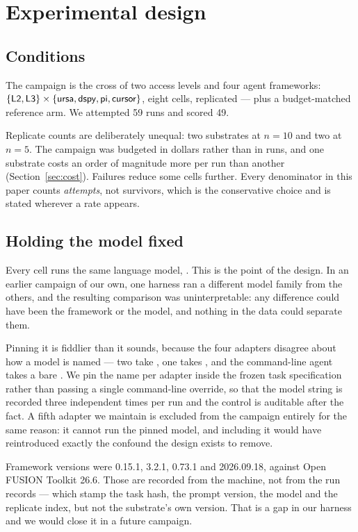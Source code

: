 \section{Experimental design}
\label{sec:design}

\subsection{Conditions}

The campaign is the cross of two access levels and four agent frameworks:
$\{\textsf{L2}{}, \textsf{L3}{}\} \times \{\textsf{ursa}, \textsf{dspy}, \textsf{pi}, \textsf{cursor}\}$,
eight cells, replicated --- plus a budget-matched \Lzero{} reference arm. We
attempted 59 runs and scored 49.

Replicate counts are deliberately unequal: two substrates at $n=10$ and two at
$n=5$. The campaign was budgeted in dollars rather than in runs, and one
substrate costs an order of magnitude more per run than another
(Section~\ref{sec:cost}). Failures reduce some cells further. Every denominator
in this paper counts \emph{attempts}, not survivors, which is the conservative
choice and is stated wherever a rate appears.

\subsection{Holding the model fixed}

Every cell runs the same language model, . This is the point of
the design. In an earlier campaign of our own, one harness ran a different
model family from the others, and the resulting comparison was uninterpretable:
any difference could have been the framework or the model, and nothing in the
data could separate them.

Pinning it is fiddlier than it sounds, because the four adapters disagree about
how a model is named --- two take , one takes
, and the command-line agent takes a bare .
We pin the name per adapter inside the frozen task specification rather than
passing a single command-line override, so that the model string is recorded
three independent times per run and the control is auditable after the fact. A
fifth adapter we maintain is excluded from the campaign entirely for the same
reason: it cannot run the pinned model, and including it would have reintroduced
exactly the confound the design exists to remove.

Framework versions were  0.15.1,  3.2.1,  0.73.1 and
 2026.09.18, against Open FUSION Toolkit 26.6. Those are recorded
from the machine, not from the run records --- which stamp the task hash, the
prompt version, the model and the replicate index, but not the substrate's own
version. That is a gap in our harness and we would close it in a future
campaign.


